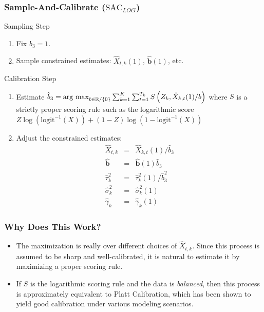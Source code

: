 \documentclass{beamer}
\newcommand{\argmax}{\operatornamewithlimits{arg\ max}}
\newcommand{\R}{\mathbb{R}}
\newcommand{\logit}{\text{logit}}
\begin{document}
 \begin{frame}
\frametitle{Sample-And-Calibrate ($\text{SAC}_{LOG}$)}

\begin{block}{Sampling Step}
\begin{enumerate}
\item Fix $b_3 = 1$.
\item Sample constrained estimates: $\hat{X}_{t,k}(1)$, $\hat{\boldsymbol{b}}(1)$, etc.
\end{enumerate}
\end{block}

\begin{block}{Calibration Step}
\begin{enumerate}
\item Estimate $ \hat{b}_3 =  \argmax_{b \in \R / \{0\}} \sum_{k=1}^K \sum_{t=1}^{T_k}  S\left(Z_k, \hat{X}_{k,t}(1) / b \right)$
where $S$ is a strictly proper scoring rule such as the logarithmic score $Z \log\left(\logit^{-1}(X)\right) + (1-Z) \log\left(1-\logit^{-1}(X)\right)$

\item Adjust the constrained estimates:
\small
\vspace{-1em}
\begin{eqnarray}
 \hat{X}_{t,k}&=& \hat{X}_{k,t}(1) / \hat{b}_3 \nonumber\\
 \hat{\boldsymbol{b}}&=& \hat{\boldsymbol{b}}(1) \hat{b}_3 \nonumber\\
   \hat{\tau}_{k}^2&=& \hat{\tau}_{k}^2(1)/ \hat{b}_3^2\nonumber\\
  \hat{\sigma}_{k}^2&=& \hat{\sigma}_{k}^2(1)\nonumber\\
  \hat{\gamma}_{k}&=& \hat{\gamma}_{k}(1)\nonumber
\end{eqnarray}

\end{enumerate}
\end{block}
\end{frame}
 
 
\begin{frame}
\frametitle{Why Does This Work?}
\begin{itemize}
\item The maximization is really over different choices of $\hat{X}_{t,k}$. Since this process is assumed to be sharp and well-calibrated, it is natural to estimate it by maximizing a proper scoring rule.
\item If $S$ is the logarithmic scoring rule and the data is \textit{balanced}, then this process is approximately equivalent to Platt Calibration, which has been shown to yield good calibration under various modeling scenarios. \cite{platt1999probabilistic, niculescu2005obtaining}
\end{itemize}
\end{frame}
  
\end{document}
